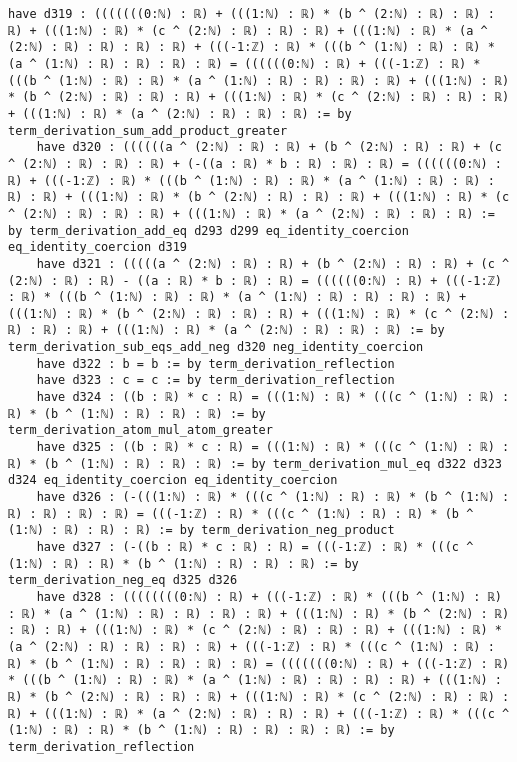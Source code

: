 \documentclass{article}
\begin{document}
\begin{tcolorbox}[colback=white!10, width=\linewidth]
\begin{lstlisting}[language=Lean4]
    have d319 : (((((((0:ℕ) : ℝ) + (((1:ℕ) : ℝ) * (b ^ (2:ℕ) : ℝ) : ℝ) : ℝ) + (((1:ℕ) : ℝ) * (c ^ (2:ℕ) : ℝ) : ℝ) : ℝ) + (((1:ℕ) : ℝ) * (a ^ (2:ℕ) : ℝ) : ℝ) : ℝ) : ℝ) + (((-1:ℤ) : ℝ) * (((b ^ (1:ℕ) : ℝ) : ℝ) * (a ^ (1:ℕ) : ℝ) : ℝ) : ℝ) : ℝ) = ((((((0:ℕ) : ℝ) + (((-1:ℤ) : ℝ) * (((b ^ (1:ℕ) : ℝ) : ℝ) * (a ^ (1:ℕ) : ℝ) : ℝ) : ℝ) : ℝ) + (((1:ℕ) : ℝ) * (b ^ (2:ℕ) : ℝ) : ℝ) : ℝ) + (((1:ℕ) : ℝ) * (c ^ (2:ℕ) : ℝ) : ℝ) : ℝ) + (((1:ℕ) : ℝ) * (a ^ (2:ℕ) : ℝ) : ℝ) : ℝ) := by term_derivation_sum_add_product_greater
    have d320 : ((((((a ^ (2:ℕ) : ℝ) : ℝ) + (b ^ (2:ℕ) : ℝ) : ℝ) + (c ^ (2:ℕ) : ℝ) : ℝ) : ℝ) + (-((a : ℝ) * b : ℝ) : ℝ) : ℝ) = ((((((0:ℕ) : ℝ) + (((-1:ℤ) : ℝ) * (((b ^ (1:ℕ) : ℝ) : ℝ) * (a ^ (1:ℕ) : ℝ) : ℝ) : ℝ) : ℝ) + (((1:ℕ) : ℝ) * (b ^ (2:ℕ) : ℝ) : ℝ) : ℝ) + (((1:ℕ) : ℝ) * (c ^ (2:ℕ) : ℝ) : ℝ) : ℝ) + (((1:ℕ) : ℝ) * (a ^ (2:ℕ) : ℝ) : ℝ) : ℝ) := by term_derivation_add_eq d293 d299 eq_identity_coercion eq_identity_coercion d319
    have d321 : (((((a ^ (2:ℕ) : ℝ) : ℝ) + (b ^ (2:ℕ) : ℝ) : ℝ) + (c ^ (2:ℕ) : ℝ) : ℝ) - ((a : ℝ) * b : ℝ) : ℝ) = ((((((0:ℕ) : ℝ) + (((-1:ℤ) : ℝ) * (((b ^ (1:ℕ) : ℝ) : ℝ) * (a ^ (1:ℕ) : ℝ) : ℝ) : ℝ) : ℝ) + (((1:ℕ) : ℝ) * (b ^ (2:ℕ) : ℝ) : ℝ) : ℝ) + (((1:ℕ) : ℝ) * (c ^ (2:ℕ) : ℝ) : ℝ) : ℝ) + (((1:ℕ) : ℝ) * (a ^ (2:ℕ) : ℝ) : ℝ) : ℝ) := by term_derivation_sub_eqs_add_neg d320 neg_identity_coercion
    have d322 : b = b := by term_derivation_reflection
    have d323 : c = c := by term_derivation_reflection
    have d324 : ((b : ℝ) * c : ℝ) = (((1:ℕ) : ℝ) * (((c ^ (1:ℕ) : ℝ) : ℝ) * (b ^ (1:ℕ) : ℝ) : ℝ) : ℝ) := by term_derivation_atom_mul_atom_greater
    have d325 : ((b : ℝ) * c : ℝ) = (((1:ℕ) : ℝ) * (((c ^ (1:ℕ) : ℝ) : ℝ) * (b ^ (1:ℕ) : ℝ) : ℝ) : ℝ) := by term_derivation_mul_eq d322 d323 d324 eq_identity_coercion eq_identity_coercion
    have d326 : (-(((1:ℕ) : ℝ) * (((c ^ (1:ℕ) : ℝ) : ℝ) * (b ^ (1:ℕ) : ℝ) : ℝ) : ℝ) : ℝ) = (((-1:ℤ) : ℝ) * (((c ^ (1:ℕ) : ℝ) : ℝ) * (b ^ (1:ℕ) : ℝ) : ℝ) : ℝ) := by term_derivation_neg_product
    have d327 : (-((b : ℝ) * c : ℝ) : ℝ) = (((-1:ℤ) : ℝ) * (((c ^ (1:ℕ) : ℝ) : ℝ) * (b ^ (1:ℕ) : ℝ) : ℝ) : ℝ) := by term_derivation_neg_eq d325 d326
    have d328 : ((((((((0:ℕ) : ℝ) + (((-1:ℤ) : ℝ) * (((b ^ (1:ℕ) : ℝ) : ℝ) * (a ^ (1:ℕ) : ℝ) : ℝ) : ℝ) : ℝ) + (((1:ℕ) : ℝ) * (b ^ (2:ℕ) : ℝ) : ℝ) : ℝ) + (((1:ℕ) : ℝ) * (c ^ (2:ℕ) : ℝ) : ℝ) : ℝ) + (((1:ℕ) : ℝ) * (a ^ (2:ℕ) : ℝ) : ℝ) : ℝ) : ℝ) + (((-1:ℤ) : ℝ) * (((c ^ (1:ℕ) : ℝ) : ℝ) * (b ^ (1:ℕ) : ℝ) : ℝ) : ℝ) : ℝ) = (((((((0:ℕ) : ℝ) + (((-1:ℤ) : ℝ) * (((b ^ (1:ℕ) : ℝ) : ℝ) * (a ^ (1:ℕ) : ℝ) : ℝ) : ℝ) : ℝ) + (((1:ℕ) : ℝ) * (b ^ (2:ℕ) : ℝ) : ℝ) : ℝ) + (((1:ℕ) : ℝ) * (c ^ (2:ℕ) : ℝ) : ℝ) : ℝ) + (((1:ℕ) : ℝ) * (a ^ (2:ℕ) : ℝ) : ℝ) : ℝ) + (((-1:ℤ) : ℝ) * (((c ^ (1:ℕ) : ℝ) : ℝ) * (b ^ (1:ℕ) : ℝ) : ℝ) : ℝ) : ℝ) := by term_derivation_reflection

\end{lstlisting}
\end{tcolorbox}
\end{document}
